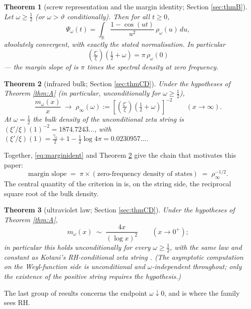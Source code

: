 \documentclass[11pt,reqno]{amsart}
\theoremstyle{plain}
\newtheorem{theorem}{Theorem}[section]
\theoremstyle{definition}
\newcommand{\R}{\mathbb{R}}
\newcommand{\lxi}[1]{\left(\tfrac{\xi'}{\xi}\right)\!#1}
\begin{document}
\begin{theorem}[screw representation and the margin identity; Section \ref{sec:thmB}]\label{thm:B}
Let $\omega\ge\tfrac12$ (or $\omega>\vartheta$ conditionally). Then for all $t\ge0$,
\begin{equation}\label{eq:screwrep}
  \Psi_\omega(t)=\int_\R\frac{1-\cos(ut)}{u^2}\,\rho_\omega(u)\,du ,
\end{equation}
absolutely convergent, with exactly the stated normalisation. In particular
\begin{equation}\label{eq:marginident}
  \boxed{\ \lxi{\left(\tfrac12+\omega\right)}=\pi\,\rho_\omega(0)\ }
\end{equation}
--- the margin slope of \cite{Margin} is $\pi$ times the spectral density at zero frequency.
\end{theorem}

\begin{theorem}[infrared bulk; Section \ref{sec:thmCD}]\label{thm:C}
Under the hypotheses of Theorem \ref{thm:A} (in particular, unconditionally for
$\omega\ge\tfrac12$),
\[
  \frac{m_\omega(x)}{x}\;\longrightarrow\;
  \rho_\infty(\omega):=\left[\lxi{\left(\tfrac12+\omega\right)}\right]^{-2}
  \qquad(x\to\infty).
\]
At $\omega=\tfrac12$ the bulk density of the unconditional zeta string is
$(\xi'/\xi)(1)^{-2}=1874.7243\ldots$, with
$(\xi'/\xi)(1)=\tfrac{\gamma_0}2+1-\tfrac12\log4\pi=0.0230957\ldots$.
\end{theorem}

Together, \eqref{eq:marginident} and Theorem \ref{thm:C} give the chain that motivates this
paper:
\[
  \text{margin slope}\;=\;\pi\times(\text{zero-frequency density of states})
  \;=\;\rho_\infty^{-1/2} .
\]
The central quantity of the criterion in \cite{Margin} is, on the string side, the reciprocal
square root of the bulk density.

\begin{theorem}[ultraviolet law; Section \ref{sec:thmCD}]\label{thm:D}
Under the hypotheses of Theorem \ref{thm:A},
\[
  m_\omega(x)\;\sim\;\frac{4x}{(\log x)^2}\qquad(x\to0^+);
\]
in particular this holds unconditionally for every $\omega\ge\tfrac12$, with the same law and
constant as Kotani's RH-conditional zeta string \cite{Kotani}. (The asymptotic computation on
the Weyl-function side is unconditional and $\omega$-independent throughout; only the
existence of the positive string requires the hypothesis.)
\end{theorem}

The last group of results concerns the endpoint $\omega\downarrow0$, and is where the family
sees RH.
\end{document}
